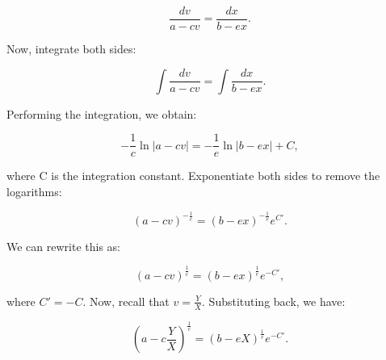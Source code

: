 \documentclass{article}
\begin{document}
\[\frac{dv}{a-cv} = \frac{dx}{b-ex}.\]

Now, integrate both sides:

\[\int \frac{dv}{a-cv} = \int \frac{dx}{b-ex}.\]

Performing the integration, we obtain:

\[-\frac{1}{c}\ln|a-cv| = -\frac{1}{e}\ln|b-ex| + C,\]

where C is the integration constant. Exponentiate both sides to remove the logarithms:

\[(a-cv)^{-\frac{1}{c}} = (b-ex)^{-\frac{1}{e}}e^{C'}.\]

We can rewrite this as:

\[(a-cv)^{\frac{1}{c}} = (b-ex)^{\frac{1}{e}}e^{-C'},\]

where \(C' = -C\). Now, recall that \(v = \frac{Y}{X}\). Substituting back, we have:

\[\left(a-c\frac{Y}{X}\right)^{\frac{1}{c}} = \left(b-eX\right)^{\frac{1}{e}}e^{-C'}.\]
\end{document}
